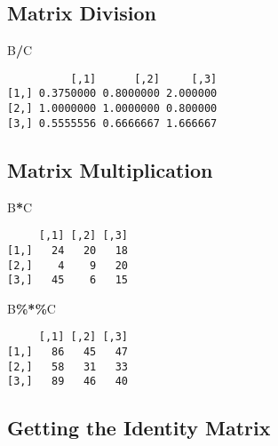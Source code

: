 \documentclass[
]{article}
\newenvironment{Shaded}{\begin{snugshade}}{\end{snugshade}}
\newcommand{\NormalTok}[1]{#1}
\newcommand{\SpecialCharTok}[1]{\textcolor[rgb]{0.81,0.36,0.00}{\textbf{#1}}}
\begin{document}
\hypertarget{matrix-division}{%
\subsection{Matrix Division}\label{matrix-division}}

\begin{Shaded}
\begin{Highlighting}[]
\NormalTok{B}\SpecialCharTok{/}\NormalTok{C}
\end{Highlighting}
\end{Shaded}

\begin{verbatim}
          [,1]      [,2]     [,3]
[1,] 0.3750000 0.8000000 2.000000
[2,] 1.0000000 1.0000000 0.800000
[3,] 0.5555556 0.6666667 1.666667
\end{verbatim}

\hypertarget{matrix-multiplication}{%
\subsection{Matrix Multiplication}\label{matrix-multiplication}}

\begin{Shaded}
\begin{Highlighting}[]
\NormalTok{B}\SpecialCharTok{*}\NormalTok{C}
\end{Highlighting}
\end{Shaded}

\begin{verbatim}
     [,1] [,2] [,3]
[1,]   24   20   18
[2,]    4    9   20
[3,]   45    6   15
\end{verbatim}

\begin{Shaded}
\begin{Highlighting}[]
\NormalTok{B}\SpecialCharTok{\%*\%}\NormalTok{C}
\end{Highlighting}
\end{Shaded}

\begin{verbatim}
     [,1] [,2] [,3]
[1,]   86   45   47
[2,]   58   31   33
[3,]   89   46   40
\end{verbatim}

\hypertarget{getting-the-identity-matrix}{%
\subsection{Getting the Identity
Matrix}\label{getting-the-identity-matrix}}
\end{document}
